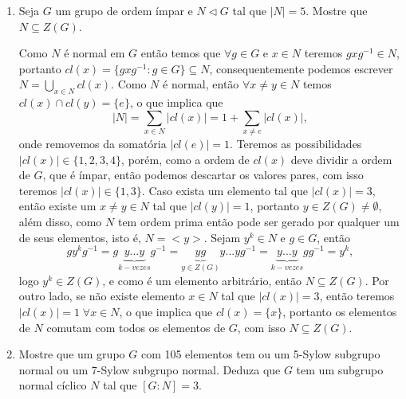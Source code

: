 \documentclass{article}
\begin{document}
\begin{enumerate}
		\item Seja $G$ um grupo de ordem ímpar e $N\triangleleft G$ tal que $|N| = 5$. Mostre que $N \subseteq Z(G)$.
		
		Como $N$ é normal em $G$ então temos que $\forall g \in G$ e $x \in N$ teremos $gxg^{-1} \in N$, portanto $cl(x) = \{gxg^{-1}: g \in G \} \subseteq N$, consequentemente podemos escrever $N = \bigcup_{x \in N} cl(x)$. Como $N$ é normal, então $\forall x \neq y \in N$ temos $cl(x) \cap cl(y) = \{e\}$, o que implica que
		$$
		|N| = \sum_{x \in N} |cl(x)| = 1+\sum_{x \neq e}|cl(x)|,
		$$
		onde removemos da somatória $|cl(e)| = 1$. Teremos as possibilidades $|cl(x)| \in \{1, 2 , 3 , 4\}$, porém, como a ordem de $cl(x)$ deve dividir a ordem de $G$, que é ímpar, então podemos descartar os valores pares, com isso teremos $|cl(x)| \in \{1, 3\}$. Caso exista um elemento tal que $|cl(x)| = 3$, então existe um $x \neq y \in N$ tal que $|cl(y)| = 1$, portanto $y \in Z(G) \neq \emptyset$, além disso, como $N$ tem ordem prima então pode ser gerado por qualquer um de seus elementos, isto é, $N = <y>$. Sejam $y^{k} \in N$ e $g \in G$, então
		$$
		gy^{k}g^{-1} = g \underbrace{y...y}_{k-vezes}g^{-1} = \underbrace{ yg }_{y \in Z(G)} y...y g^{-1} = \underbrace{y...y}_{k-vezes}gg^{-1} = y^{k},
		$$
		logo $y^{k} \in Z(G)$, e como é um elemento arbitrário, então $N \subseteq Z(G)$.
		Por outro lado, se não existe elemento $x \in N$ tal que $|cl(x)| = 3$, então teremos $|cl(x)| = 1 \; \forall x \in N$, o que implica que $cl(x) = \{x\}$, portanto os elementos de $N$ comutam com todos os elementos de $G$, com isso $N \subseteq Z(G)$.
		
		\item Mostre que um grupo $G$ com 105 elementos tem ou um 5-Sylow subgrupo normal ou um 7-Sylow subgrupo normal. Deduza que  $G$ tem um subgrupo normal cíclico $N$ tal que $[G:N] = 3$.
		

\end{enumerate}
\end{document}
